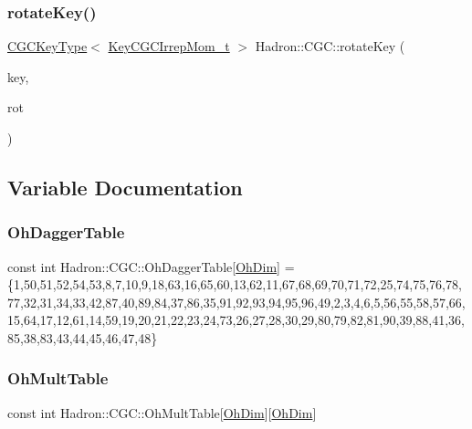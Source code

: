 \mbox{\label{namespaceHadron_1_1CGC_ad5f1f6f8b8dd82238f3efeb03d1dc6e5}} 
\subsubsection{\texorpdfstring{rotateKey()}{rotateKey()}\hspace{0.1cm}{\footnotesize\ttfamily [2/2]}}
{\footnotesize\ttfamily \mbox{\hyperlink{structHadron_1_1CGCKeyType}{C\+G\+C\+Key\+Type}}$<$ \mbox{\hyperlink{structHadron_1_1KeyCGCIrrepMom__t}{Key\+C\+G\+C\+Irrep\+Mom\+\_\+t}} $>$ Hadron\+::\+C\+G\+C\+::rotate\+Key (\begin{DoxyParamCaption}\item[{const \mbox{\hyperlink{structHadron_1_1CGCKeyType}{C\+G\+C\+Key\+Type}}$<$ \mbox{\hyperlink{structHadron_1_1KeyCGCIrrepMom__t}{Key\+C\+G\+C\+Irrep\+Mom\+\_\+t}} $>$ \&}]{key,  }\item[{const \mbox{\hyperlink{structHadron_1_1RotateVec__t}{Rotate\+Vec\+\_\+t}} \&}]{rot }\end{DoxyParamCaption})}



\subsection{Variable Documentation}
\mbox{\label{namespaceHadron_1_1CGC_af366e5e97395d0d95377898177cdbb79}} 
\subsubsection{\texorpdfstring{OhDaggerTable}{OhDaggerTable}}
{\footnotesize\ttfamily const int Hadron\+::\+C\+G\+C\+::\+Oh\+Dagger\+Table\mbox{[}\mbox{\hyperlink{namespaceHadron_a2bea98b7ecd13619ef78b6d204d59707}{Oh\+Dim}}\mbox{]} = \{1,50,51,52,54,53,8,7,10,9,18,63,16,65,60,13,62,11,67,68,69,70,71,72,25,74,75,76,78,77,32,31,34,33,42,87,40,89,84,37,86,35,91,92,93,94,95,96,49,2,3,4,6,5,56,55,58,57,66,15,64,17,12,61,14,59,19,20,21,22,23,24,73,26,27,28,30,29,80,79,82,81,90,39,88,41,36,85,38,83,43,44,45,46,47,48\}}

\mbox{\label{namespaceHadron_1_1CGC_a7737922afb0c060e8cc522adbb5b2723}} 
\subsubsection{\texorpdfstring{OhMultTable}{OhMultTable}}
{\footnotesize\ttfamily const int Hadron\+::\+C\+G\+C\+::\+Oh\+Mult\+Table\mbox{[}\mbox{\hyperlink{namespaceHadron_a2bea98b7ecd13619ef78b6d204d59707}{Oh\+Dim}}\mbox{]}\mbox{[}\mbox{\hyperlink{namespaceHadron_a2bea98b7ecd13619ef78b6d204d59707}{Oh\+Dim}}\mbox{]}}


